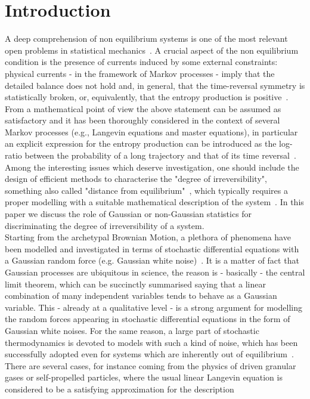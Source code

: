 \documentclass[12pt]{iopart}
\begin{document}
\section{Introduction}
A deep comprehension of non equilibrium systems
is one of the most relevant open  problems in statistical mechanics~\cite{KTH91}.
A crucial aspect of the non equilibrium condition is the presence of currents induced 
by  some external constraints: physical currents - in the framework of Markov processes - imply that the detailed balance does not hold and, in general, that the time-reversal symmetry is statistically broken, or, 
equivalently, that the entropy production  is positive~\cite{BPRV08,Sekimoto2010,seifertrev,pelipigo}.
From a mathematical  point of view  the above statement can be assumed as   satisfactory
and it   has been thoroughly considered  in the context of several  Markov processes 
(e.g., Langevin equations and master equations), in particular an explicit expression for the entropy production
can be  introduced as the log-ratio between the probability of a long trajectory and that  of its time reversal~\cite{lebowitz1999gallavotti}.\\
Among the interesting issues which deserve investigation, one should include
the design of efficient  methods to characterise the  "degree of irreversibility", something also called "distance from equilibrium"~\cite{fodor2016far},
which typically requires a  proper modelling with a suitable mathematical  description of the system~\cite{seifert2019stochastic,skinner21,van2022thermodynamic,lucente2022inference,harunari2022learn,van2022time}. In this paper we discuss the role of Gaussian or non-Gaussian statistics for discriminating the degree of irreversibility of a system.\\
Starting from  the archetypal  Brownian Motion,
a plethora of phenomena have been  modelled and investigated  in terms of stochastic differential  equations with a Gaussian  random force (e.g. Gaussian white noise)~\cite{R89}. 
It is a matter of fact that Gaussian processes are ubiquitous in science,
 the reason is -  basically -  the central limit theorem, which can be succinctly summarised saying that a linear combination of many independent variables tends to behave as a Gaussian variable.
This - already at a qualitative level - is  a  strong argument for modelling the random forces appearing in stochastic differential equations
in the form of Gaussian white noises.
For the same reason,  a large part  of  stochastic thermodynamics is devoted to models
with such a kind of noise, which has been  successfully  adopted  even  for systems which are inherently out of equilibrium~\cite{Sekimoto2010,seifertrev,pelipigo}. There are several cases, for instance coming from the physics of driven granular gases or self-propelled particles,  where the usual linear Langevin equation is considered to be a satisfying approximation for the description
\end{document}
